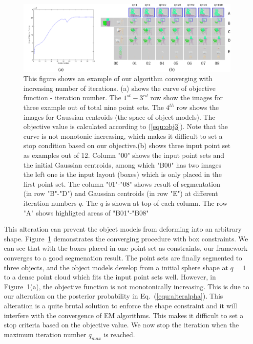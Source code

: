 \begin{figure}
	\centering
	\includegraphics[width=\linewidth]{images/Initialization/iters_merge}
	\caption{\label{fig:iter} This figure shows an example of our algorithm converging with increasing number of iterations.
		(a) shows the curve of objective function - iteration number. The $1^{st}-3^{rd}$ row show the images for three example out of total nine point sets. The $4^{th}$ row shows the images for Gaussian centroids (the space of object models). The objective value is calculated according to (\ref{equ:obj3}). Note that the curve is not monotonic increasing, which makes it difficult to set a stop condition based on our objective.(b) shows three input point set as examples out of 12. Column "00" shows the input point sets and the initial Gaussian centroids, among which "B00" has two images the left one  is the input layout (boxes) which is only placed in the first point set. The column "01"-"08" shows result of segmentation (in row "B"-"D") and Gaussian centroids (in row "E") at different iteration numbers $q$. The $q$ is shown at top of each column. The row "A" shows highligted areas of "B01"-"B08" }
\end{figure}

This alteration can prevent the object models from deforming into an arbitrary shape.
%
%
Figure~\ref{fig:iter} demonstrates the converging procedure with box constraints. 
%
We can see that with the boxes placed in one point set as constraints, our framework converges to a good segmenation result. The point sets are finally segmented to three objects, and the object models develop from a initial sphere shape at $q=1$ to a dense point cloud which fits the input point sets well. 
%
However, in Figure~\ref{fig:iter}(a), the objective function is not monotonically increasing. 
This is due to our alteration on the posterior probability in Eq.~(\ref{equ:alteralpha}). This alteration is a quite brutal solution to enforce the shape constraint and it will interfere with the convergence of EM algorithms.
% 
This makes it difficult to set a stop criteria based on the objective value. 
We now stop the iteration when the maximum iteration number $q_{max}$ is reached.
 
